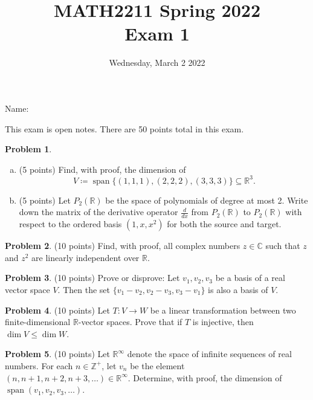\documentclass[11pt,oneside]{amsart}
\title{MATH2211 Spring 2022\\
Exam 1}
\author{Wednesday, March 2 2022}
\theoremstyle{definition}
\newtheorem{problem}{Problem}
\newcommand{\bC}{\mathbb{C}}
\newcommand{\bR}{\mathbb{R}}
\newcommand{\bZ}{\mathbb{Z}}
\DeclareMathOperator{\Span}{span}
\begin{document}
    \maketitle

    Name: \underline{\hspace{6cm}}

    This exam is open notes. There are 50 points total in this exam.

    \begin{problem}
        \leavevmode\begin{enumerate}[(a)]
            \item (5 points) Find, with proof, the dimension of
            \[V\coloneqq\Span\{(1,1,1), (2,2,2), (3,3,3)\}\subseteq\bR^3.\]
            \vfill
            \item (5 points) Let $P_2(\bR)$ be the space of polynomials of degree at most 2. Write down the matrix of the derivative operator $\frac {d}{dx}$ from $P_2(\bR)$ to $P_2(\bR)$ with respect to the ordered basis $(1,x,x^2)$ for both the source and target.
            \vfill
        \end{enumerate}
    \end{problem}
    \newpage

    \begin{problem}
        (10 points) Find, with proof, all complex numbers $z\in\bC$ such that $z$ and $z^2$ are linearly independent over $\bR$.
    \end{problem}
    \vfill

    \begin{problem}
        (10 points) Prove or disprove: Let $v_1,v_2,v_3$ be a basis of a real vector space $V$. Then the set $\{v_1-v_2,v_2-v_3,v_3-v_1\}$ is also a basis of $V$.
    \end{problem}
    \vfill
    \newpage

    \begin{problem}
        (10 points) Let $T\colon V\to W$ be a linear transformation between two finite-dimensional $\bR$-vector spaces. Prove that if $T$ is injective, then $\dim V\leq\dim W$.
    \end{problem}
    \newpage

    \begin{problem}
        (10 points) Let $\bR^\infty$ denote the space of infinite sequences of real numbers. For each $n\in\bZ^+$, let $v_n$ be the element $(n,n+1,n+2,n+3,\dots)\in\bR^\infty$. Determine, with proof, the dimension of $\Span(v_1,v_2,v_3,\dots)$.
    \end{problem}
    \vfill
\end{document}
